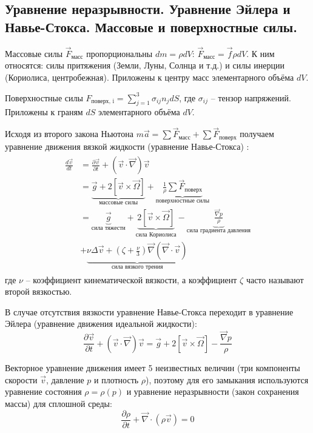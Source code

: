 \subsection{Уравнение неразрывности. Уравнение Эйлера и Навье-Стокса. Массовые и поверхностные силы.}
Массовые силы $\vec{F}_\text{масс}$ пропорциональны $dm=\rho dV$: $\vec{F}_\text{масс}=\vec{f}\rho dV$.
К ним относятся: силы притяжения (Земли, Луны, Солнца и т.д.) и силы инерции (Кориолиса, центробежная).
Приложены к центру масс элементарного объёма $dV$.

Поверхностные силы $F_\text{поверх, i}=\sum_{j=1}^{3}\sigma_{ij}n_j dS$, где $\sigma_{ij}$ -- тензор напряжений.
Приложены к граням $dS$ элементарного объёма $dV$.

Исходя из второго закона Ньютона $m\vec{a}=\sum\vec{F}_\text{масс}+\sum\vec{F}_\text{поверх}$ получаем уравнение движения вязкой жидкости (уравнение Навье-Стокса) \cite{Nosov2019-6}:
\begin{align}\label{eq-2-2-1}
\begin{split}
\frac{d\vec{v}}{dt}
&=
\frac{\partial\vec{v}}{\partial t}+\left(\vec{v}\cdot\vec{\nabla}\right)\vec{v}
\\
&=
\underbrace{\vec{g}+2\left[\vec{v}\times\vec{\Omega}\right]}_\text{массовые силы}
+\underbrace{\frac{1}{\rho}\sum\vec{F}_\text{поверх}}_\text{поверхностные силы}
\\
&=
\underbrace{\vec{g}}_\text{сила тяжести}
+\underbrace{2\left[\vec{v}\times\vec{\Omega}\right]}_\text{сила Кориолиса}
-\underbrace{\frac{\vec{\nabla}p}{\rho}}_\text{сила градиента давления}
\\
&+
\underbrace{\nu\Delta\vec{v}+\left(\zeta+\frac{\nu}{3}\right)\vec{\nabla}\left(\vec{\nabla}\cdot\vec{v}\right)}_\text{сила вязкого трения}
\end{split}
\end{align}
где $\nu$ -- коэффициент кинематической вязкости, а коэффициент $\zeta$ часто называют второй вязкостью.

В случае отсутствия вязкости уравнение Навье-Стокса переходит в уравнение Эйлера (уравнение движения идеальной жидкости):
\begin{equation}\label{eq-2-2-2}
\frac{\partial\vec{v}}{\partial t}+\left(\vec{v}\cdot\vec{\nabla}\right)\vec{v}=\vec{g}+2\left[\vec{v}\times\vec{\Omega}\right]-\frac{\vec{\nabla}p}{\rho}
\end{equation}

Векторное уравнение движения имеет 5 неизвестных величин (три компоненты скорости $\vec{v}$, давление $p$ и плотность $\rho$), поэтому для его замыкания используются уравнение состояния $\rho=\rho(p)$ и уравнение неразрывности (закон сохранения массы) для сплошной среды:
\begin{equation}\label{eq-2-2-3}
\frac{\partial\rho}{\partial t}+\vec{\nabla}\cdot(\rho\vec{v})=0
\end{equation}
